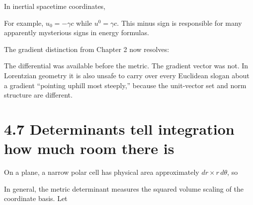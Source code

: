 \documentclass[
  11pt,
  letterpaper,
  oneside,
  openany]{scrbook}
\begin{document}
In inertial spacetime coordinates,

\begin{center}
\begingroup
{}
\ifdim\wd\grmathbox>\linewidth
\resizebox{\linewidth}{!}{\usebox{\grmathbox}}
\else\usebox{\grmathbox}\fi
\endgroup
\end{center}

For example, \(u_0=-\gamma c\) while \(u^0=\gamma c\). This minus sign
is responsible for many apparently mysterious signs in energy formulas.

The gradient distinction from Chapter 2 now resolves:

\begin{center}
\begingroup
{}
\ifdim\wd\grmathbox>\linewidth
\resizebox{\linewidth}{!}{\usebox{\grmathbox}}
\else\usebox{\grmathbox}\fi
\endgroup
\end{center}

The differential was available before the metric. The gradient vector
was not. In Lorentzian geometry it is also unsafe to carry over every
Euclidean slogan about a gradient ``pointing uphill most steeply,''
because the unit-vector set and norm structure are different.

\hypertarget{determinants-tell-integration-how-much-room-there-is}{%
\section{4.7 Determinants tell integration how much room there
is}\label{determinants-tell-integration-how-much-room-there-is}}

On a plane, a narrow polar cell has physical area approximately
\(dr\times r\,d\theta\), so

\begin{center}
\begingroup
{}
\ifdim\wd\grmathbox>\linewidth
\resizebox{\linewidth}{!}{\usebox{\grmathbox}}
\else\usebox{\grmathbox}\fi
\endgroup
\end{center}

In general, the metric determinant measures the squared volume scaling
of the coordinate basis. Let
\end{document}
